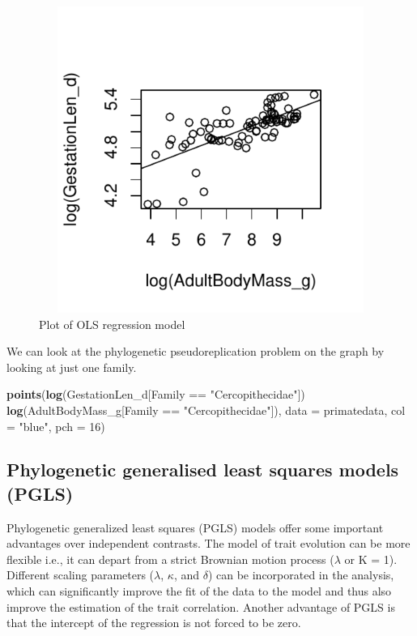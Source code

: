 \documentclass[12pt]{article}
\newcommand{\KeywordTok}[1]{\textcolor[rgb]{0.13,0.29,0.53}{\textbf{{#1}}}}
\newcommand{\DataTypeTok}[1]{\textcolor[rgb]{0.13,0.29,0.53}{{#1}}}
\newcommand{\DecValTok}[1]{\textcolor[rgb]{0.00,0.00,0.81}{{#1}}}
\newcommand{\StringTok}[1]{\textcolor[rgb]{0.31,0.60,0.02}{{#1}}}
\newcommand{\NormalTok}[1]{{#1}}
\begin{document}
\begin{figure}[H]
\centering
\includegraphics[width = 30cm, height = 10cm, keepaspectratio=true]{OLSplot.pdf}
\caption{Plot of OLS regression model}
\label{figure}
\end{figure}
 
We can look at the phylogenetic pseudoreplication problem on the graph by looking at just one family.

\begin{snugshade}
\begin{Highlighting}[]
\KeywordTok{points}\NormalTok{(}\KeywordTok{log}\NormalTok{(GestationLen_d[Family ==}\StringTok{ "Cercopithecidae"}\NormalTok{]) ~}
      \StringTok{ }\KeywordTok{log}\NormalTok{(AdultBodyMass_g[Family ==}\StringTok{ } \StringTok{"Cercopithecidae"}\NormalTok{]), }
       \DataTypeTok{data =} \NormalTok{primatedata, }\DataTypeTok{col =} \StringTok{"blue"}\NormalTok{, }\DataTypeTok{pch =} \DecValTok{16}\NormalTok{)}
\end{Highlighting}
\end{snugshade}

\subsection{Phylogenetic generalised least squares models (PGLS)}
Phylogenetic generalized least squares (PGLS) models offer some important advantages over independent contrasts. The model of trait evolution can be more flexible i.e., it can depart from a strict Brownian motion process ($\lambda$ or K = 1). Different scaling parameters ($\lambda$, $\kappa$, and $\delta$) can be incorporated in the analysis, which can significantly improve the fit of the data to the model and thus also improve the estimation of the trait correlation. Another advantage of PGLS is that the intercept of the regression is not forced to be zero.
\end{document}
